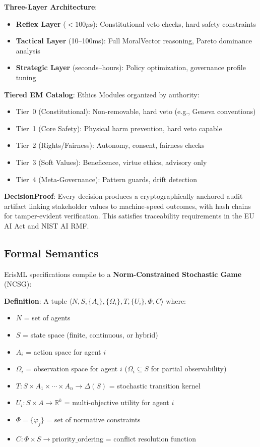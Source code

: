 \documentclass[conference]{IEEEtran}
\begin{document}
\textbf{Three-Layer Architecture}:
\begin{itemize}
\item \textbf{Reflex Layer} ($<100\mu$s): Constitutional veto checks, hard safety constraints
\item \textbf{Tactical Layer} (10--100ms): Full MoralVector reasoning, Pareto dominance analysis
\item \textbf{Strategic Layer} (seconds--hours): Policy optimization, governance profile tuning
\end{itemize}

\textbf{Tiered EM Catalog}: Ethics Modules organized by authority:
\begin{itemize}
\item Tier~0 (Constitutional): Non-removable, hard veto (e.g., Geneva conventions)
\item Tier~1 (Core Safety): Physical harm prevention, hard veto capable
\item Tier~2 (Rights/Fairness): Autonomy, consent, fairness checks
\item Tier~3 (Soft Values): Beneficence, virtue ethics, advisory only
\item Tier~4 (Meta-Governance): Pattern guards, drift detection
\end{itemize}

\textbf{DecisionProof}: Every decision produces a cryptographically anchored audit artifact linking stakeholder values to machine-speed outcomes, with hash chains for tamper-evident verification. This satisfies traceability requirements in the EU AI Act and NIST AI RMF.

\subsection{Formal Semantics}

ErisML specifications compile to a \textbf{Norm-Constrained Stochastic
Game} (NCSG):

\textbf{Definition}: A tuple $\langle N, S, \{A_i\}, \{\Omega_i\}, T, \{U_i\}, \Phi, C \rangle$ where:
\begin{itemize}
\item $N$ = set of agents
\item $S$ = state space (finite, continuous, or hybrid)
\item $A_i$ = action space for agent $i$
\item $\Omega_i$ = observation space for agent $i$ ($\Omega_i \subseteq S$ for partial observability)
\item $T: S \times A_1 \times \cdots \times A_n \to \Delta(S)$ = stochastic transition kernel
\item $U_i: S \times A \to \mathbb{R}^k$ = multi-objective utility for agent $i$
\item $\Phi = \{\varphi_j\}$ = set of normative constraints
\item $C: \Phi \times S \to \text{priority\_ordering}$ = conflict resolution function
\end{itemize}
\end{document}
